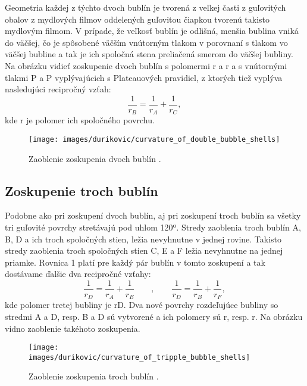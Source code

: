 \noindent Geometria každej z týchto dvoch bublín je tvorená z veľkej časti z guľovitých obalov z mydlových filmov oddelených guľovitou čiapkou tvorenú takisto mydlovým filmom. V prípade, že veľkosť bublín je odlišná, menšia bublina vniká do väčšej, čo je spôsobené väčším vnútorným tlakom v porovnaní s tlakom vo väčšej bubline a tak je ich spoločná stena preliačená smerom do väčšej bubliny. Na obrázku  vidieť zoskupenie dvoch bublín s polomermi r a r a s vnútornými tlakmi P a P vyplývajúcich s Plateauových pravidiel, z ktorých tiež vyplýva nasledujúci recipročný vzťah:
\begin{equation}
	\frac{1}{r_{B}} = \frac{1}{r_{A}} + \frac{1}{r_{C}},
\end{equation}
kde r je polomer ich spoločného povrchu.
\begin{figure}[H]
	\begin{center}
		\texttt{[image: images/durikovic/curvature\_of\_double\_bubble\_shells]}
		\caption{Zaoblenie zoskupenia dvoch bublín \cite{durikovic2001}.}
		\label{img:curvature_of_double_bubble_shells}
	\end{center}
\end{figure}

\subsection{Zoskupenie troch bublín}

Podobne ako pri zoskupení dvoch bublín, aj pri zoskupení troch bublín sa všetky tri guľovité povrchy stretávajú pod uhlom 120º. Stredy zaoblenia troch bublín A, B, D a ich troch spoločných stien, ležia nevyhnutne v jednej rovine. Takisto stredy zaoblenia troch spoločných stien C, E a F ležia nevyhnutne na jednej priamke. Rovnica 1 platí pre každý pár bublín v tomto zoskupení a tak dostávame ďalšie dva recipročné vzťahy:
\begin{equation}
	\frac{1}{r_{D}} = \frac{1}{r_{A}} + \frac{1}{r_{E}} \qquad,\qquad \frac{1}{r_{D}} = \frac{1}{r_{B}} + \frac{1}{r_{F}},
\end{equation}
kde polomer tretej bubliny je rD. Dva nové povrchy rozdeľujúce bubliny so stredmi A a D, resp. B a D sú vytvorené a ich polomery sú r, resp. r. Na obrázku  vidno zaoblenie takéhoto zoskupenia.
\begin{figure}[H]
	\begin{center}
		\texttt{[image: images/durikovic/curvature\_of\_tripple\_bubble\_shells]}
		\caption{Zaoblenie zoskupenia troch bublín \cite{durikovic2001}.}
		\label{img:curvature_of_tripple_bubble_shells}
	\end{center}
\end{figure}

